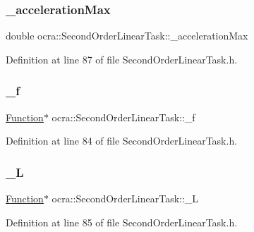 \subsubsection{\texorpdfstring{\+\_\+acceleration\+Max}{\_accelerationMax}}
{\footnotesize\ttfamily double ocra\+::\+Second\+Order\+Linear\+Task\+::\+\_\+acceleration\+Max\hspace{0.3cm}{\ttfamily [protected]}}



Definition at line 87 of file Second\+Order\+Linear\+Task.\+h.

\hypertarget{classocra_1_1SecondOrderLinearTask_a55c45007880f6ba1936bc9b4601dc58e}{}\label{classocra_1_1SecondOrderLinearTask_a55c45007880f6ba1936bc9b4601dc58e} 
\subsubsection{\texorpdfstring{\+\_\+f}{\_f}}
{\footnotesize\ttfamily \hyperlink{classocra_1_1Function}{Function}$\ast$ ocra\+::\+Second\+Order\+Linear\+Task\+::\+\_\+f\hspace{0.3cm}{\ttfamily [protected]}}



Definition at line 84 of file Second\+Order\+Linear\+Task.\+h.

\hypertarget{classocra_1_1SecondOrderLinearTask_a386a6daf02add8b19a69e1aa411c63af}{}\label{classocra_1_1SecondOrderLinearTask_a386a6daf02add8b19a69e1aa411c63af} 
\subsubsection{\texorpdfstring{\+\_\+L}{\_L}}
{\footnotesize\ttfamily \hyperlink{classocra_1_1Function}{Function}$\ast$ ocra\+::\+Second\+Order\+Linear\+Task\+::\+\_\+L\hspace{0.3cm}{\ttfamily [protected]}}



Definition at line 85 of file Second\+Order\+Linear\+Task.\+h.

\hypertarget{classocra_1_1SecondOrderLinearTask_a0d433a32e0892bdf98d3b15325b6917e}{}\label{classocra_1_1SecondOrderLinearTask_a0d433a32e0892bdf98d3b15325b6917e} 
